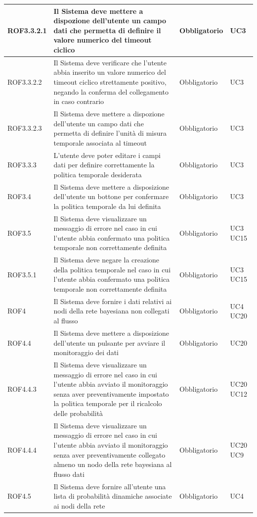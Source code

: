 \begin{center}
\begin{longtable}[c]{|m{}|m{}|m{}|m{}|}
\hline
ROF3.3.2.1 & Il Sistema deve mettere a dispozione dell'utente un campo dati che permetta di definire il valore numerico del timeout ciclico & Obbligatorio & UC3\\
\hline
ROF3.3.2.2 & Il Sistema deve verificare che l’utente abbia inserito un valore numerico
del timeout ciclico strettamente positivo, negando la conferma del collegamento in caso contrario & Obbligatorio & UC3 \\
\hline
\rowcolor{grigio}ROF3.3.2.3 & Il Sistema deve mettere a dispozione dell'utente un campo dati che permetta di definire l'unità di misura temporale associata al timeout & Obbligatorio & UC3\\
\hline
ROF3.3.3 & L'utente deve poter editare i campi dati per definire correttamente la politica temporale desiderata & Obbligatorio & UC3\\
\hline
\rowcolor{grigio}ROF3.4 & Il Sistema deve mettere a disposizione dell'utente un bottone per confermare la politica temporale da lui definita & Obbligatorio & UC3\\
\hline
ROF3.5 & Il Sistema deve visualizzare un messaggio di errore nel caso in cui l'utente abbia confermato una politica temporale non correttamente definita & Obbligatorio & UC3 UC15\\
\hline
ROF3.5.1 & Il Sistema deve negare la creazione della politica temporale nel caso in cui l'utente abbia confermato una politica temporale non correttamente definita & Obbligatorio & UC3 UC15 \\
\hline
\rowcolor{grigio}ROF4 & Il Sistema deve fornire i dati relativi ai nodi della rete bayesiana non collegati al flusso & Obbligatorio & UC4 UC20\\
\hline
ROF4.4 & Il Sistema deve mettere a disposizione dell'utente un pulsante per avviare il monitoraggio dei dati & Obbligatorio & UC20\\
\hline
\rowcolor{grigio}ROF4.4.3 & Il Sistema deve visualizzare un messaggio di errore nel caso in cui l'utente abbia avviato il monitoraggio senza aver preventivamente impostato la politica temporale per il ricalcolo delle probabilità & Obbligatorio & UC20 UC12\\
\hline
ROF4.4.4 & Il Sistema deve visualizzare un messaggio di errore nel caso in cui l'utente abbia avviato il monitoraggio senza aver preventivamente collegato almeno un nodo della rete bayesiana al flusso dati & Obbligatorio & UC20 UC9\\
\hline
ROF4.5 & Il Sistema deve fornire all'utente una lista di probabilità dinamiche associate ai nodi della rete & Obbligatorio & UC4\\

\end{longtable}
\end{center}
